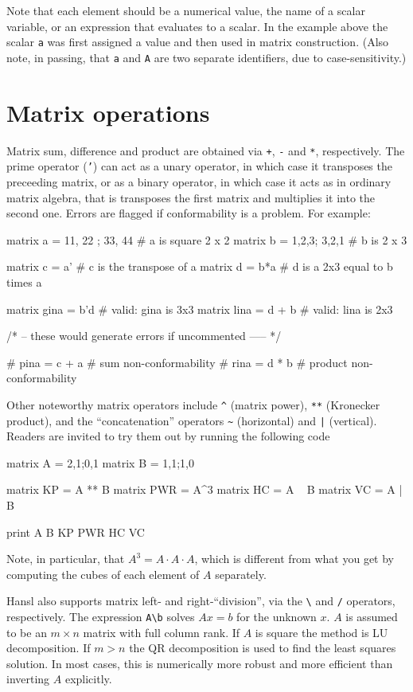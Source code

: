 Note that each element should be a numerical value, the name of a
scalar variable, or an expression that evaluates to a scalar. In the
example above the scalar \texttt{a} was first assigned a value and
then used in matrix construction. (Also note, in passing, that
\texttt{a} and \texttt{A} are two separate identifiers, due to
case-sensitivity.)

\section{Matrix operations}
\label{sec:mat-op}

Matrix sum, difference and product are obtained via \texttt{+},
\texttt{-} and \texttt{*}, respectively. The prime operator
(\texttt{'}) can act as a unary operator, in which case it transposes
the preceeding matrix, or as a binary operator, in which case it acts
as in ordinary matrix algebra, that is transposes the first matrix and
multiplies it into the second one. Errors are flagged if
conformability is a problem. For example:
\begin{code}
  matrix a = {11, 22 ; 33, 44}  # a is square 2 x 2
  matrix b = {1,2,3; 3,2,1}     # b is 2 x 3

  matrix c = a'         # c is the transpose of a
  matrix d = b*a        # d is a 2x3 equal to b times a

  matrix gina = b'd     # valid: gina is 3x3
  matrix lina = d + b   # valid: lina is 2x3

  /* -- these would generate errors if uncommented ----- */

  # pina = c + a  # sum non-conformability
  # rina = d * b  # product non-conformability
\end{code}

Other noteworthy matrix operators include \texttt{\^} (matrix power),
\texttt{**} (Kronecker product), and the ``concatenation'' operators
\verb|~| (horizontal) and \texttt{|} (vertical). Readers are invited
to try them out by running the following code
\begin{code}
matrix A = {2,1;0,1}
matrix B = {1,1;1,0}

matrix KP = A ** B
matrix PWR = A^3 
matrix HC = A ~ B
matrix VC = A | B

print A B KP PWR HC VC
\end{code}
Note, in particular, that $A^3 = A \cdot A \cdot A$, which is different
from what you get by computing the cubes of each element of $A$
separately.

Hansl also supports matrix left- and right-``division'', via the
\verb'\' and \verb'/' operators, respectively. The expression
\verb|A\b| solves $Ax = b$ for the unknown $x$. $A$ is assumed to be
an $m \times n$ matrix with full column rank. If $A$ is square the
method is LU decomposition. If $m > n$ the QR decomposition is used to
find the least squares solution. In most cases, this is numerically
more robust and more efficient than inverting $A$ explicitly.


